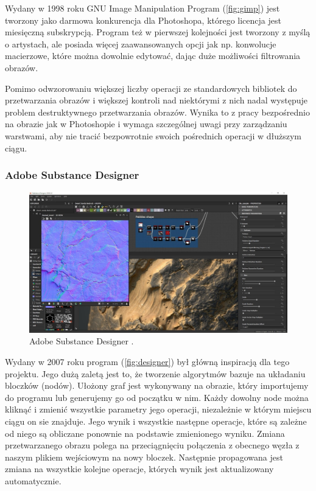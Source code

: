 Wydany w 1998 roku GNU Image Manipulation Program (\autoref{fig:gimp}) jest tworzony jako darmowa konkurencja dla Photoshopa, którego licencja jest miesięczną subskrypcją. Program też w pierwszej kolejności jest tworzony z myślą o artystach, ale posiada więcej zaawansowanych opcji jak np. konwolucje macierzowe, które można dowolnie edytować, dając duże możliwości filtrowania obrazów.

Pomimo odwzorowaniu większej liczby operacji ze standardowych bibliotek do przetwarzania obrazów i większej kontroli nad niektórymi z nich nadal występuje problem destruktywnego przetwarzania obrazów. Wynika to z pracy bezpośrednio na obrazie jak w Photoshopie i wymaga szczególnej uwagi przy zarządzaniu warstwami, aby nie tracić bezpowrotnie swoich pośrednich operacji w dłuższym ciągu.

\subsubsection{Adobe Substance Designer}
\begin{figure}[H]
    \centering
    \includegraphics{./images/Picture6.jpg}
    \caption{Adobe Substance Designer \cite{designer}.}
    \label{fig:designer}
\end{figure}

Wydany w 2007 roku program (\autoref{fig:designer}) był główną inspiracją dla tego projektu. 
Jego dużą zaletą jest to, że tworzenie algorytmów bazuje na układaniu bloczków (nodów). 
Ułożony graf jest wykonywany na obrazie, który importujemy do programu lub generujemy go od początku w nim. 
Każdy dowolny node można kliknąć i zmienić wszystkie parametry jego operacji, niezależnie w którym miejscu ciągu on sie znajduje.
Jego wynik i wszystkie następne operacje, które są zależne od niego są obliczane ponownie na podstawie zmienionego wyniku. 
Zmiana przetwarzanego obrazu polega na przeciągnięciu połączenia z obecnego węzła z naszym plikiem wejściowym na nowy bloczek. Następnie propagowana jest zmiana na wszystkie kolejne operacje, których wynik jest aktualizowany automatycznie.

